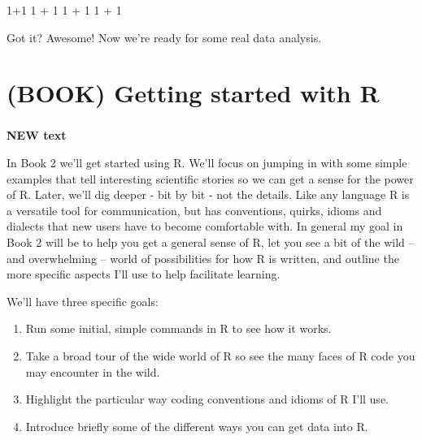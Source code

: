 \documentclass[
]{book}
\newenvironment{Shaded}{\begin{snugshade}}{\end{snugshade}}
\newcommand{\DecValTok}[1]{\textcolor[rgb]{0.00,0.00,0.81}{#1}}
\newcommand{\SpecialCharTok}[1]{\textcolor[rgb]{0.00,0.00,0.00}{#1}}
\providecommand{\tightlist}{%
  \setlength{\itemsep}{0pt}\setlength{\parskip}{0pt}}
\begin{document}
\begin{Shaded}
\begin{Highlighting}[]
\DecValTok{1}\SpecialCharTok{+}\DecValTok{1}
\DecValTok{1} \SpecialCharTok{+} \DecValTok{1}
\DecValTok{1}          \SpecialCharTok{+}        \DecValTok{1}
\DecValTok{1} \SpecialCharTok{+}                                   \DecValTok{1}
\end{Highlighting}
\end{Shaded}

Got it? Awesome! Now we're ready for some real data analysis.

\hypertarget{book-getting-started-with-r}{%
\chapter*{(BOOK) Getting started with R}\label{book-getting-started-with-r}}

\hypertarget{section}{%
\subsection*{}\label{section}}

\textbf{NEW text}

In Book 2 we'll get started using R. We'll focus on jumping in with some simple examples that tell interesting scientific stories so we can get a sense for the power of R. Later, we'll dig deeper - bit by bit - not the details. Like any language R is a versatile tool for communication, but has conventions, quirks, idioms and dialects that new users have to become comfortable with. In general my goal in Book 2 will be to help you get a general sense of R, let you see a bit of the wild -- and overwhelming -- world of possibilities for how R is written, and outline the more specific aspects I'll use to help facilitate learning.

We'll have three specific goals:

\begin{enumerate}
\def\labelenumi{\arabic{enumi}.}
\tightlist
\item
  Run some initial, simple commands in R to see how it works.
\item
  Take a broad tour of the wide world of R so see the many faces of R code you may encounter in the wild.
\item
  Highlight the particular way coding conventions and idioms of R I'll use.
\item
  Introduce briefly some of the different ways you can get data into R.
\end{enumerate}
\end{document}
